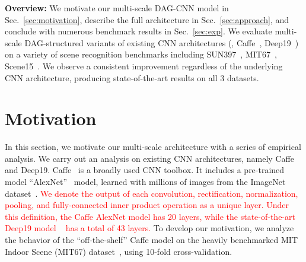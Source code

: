 \documentclass[10pt,twocolumn,letterpaper]{article}
\newcommand{\new}[1]{\textcolor{red}{#1}}
\begin{document}
{\bf Overview:} We motivate our multi-scale DAG-CNN model in Sec.~\ref{sec:motivation}, describe the full architecture in Sec.~\ref{sec:approach}, and conclude with numerous benchmark results in Sec.~\ref{sec:exp}. We evaluate multi-scale DAG-structured variants of existing CNN architectures (\eg, Caffe~\cite{Caffe}, Deep19~\cite{veryDeep}) on a variety of scene recognition benchmarks including SUN397~\cite{SUN397}, MIT67~\cite{MIT67}, Scene15~\cite{Scene15}. We observe a consistent improvement regardless of the underlying CNN architecture, producing state-of-the-art results on all 3 datasets.



\section{Motivation\label{sec:motivation}}

In this section, we motivate our multi-scale architecture with a series of empirical analysis. We carry out an analysis on existing CNN architectures, namely Caffe and Deep19. Caffe~\cite{Caffe} is a broadly used CNN toolbox. It includes a pre-trained model ``AlexNet''~\cite{AlexNet} model, learned with millions of images from the ImageNet dataset~\cite{ImageNet}. \new{We denote the output of each convolution, rectification, normalization, pooling, and fully-connected inner product operation as a unique layer. Under this definition, the Caffe AlexNet model has 20 layers, while the state-of-the-art Deep19 model ~\cite{veryDeep} has a total of 43 layers.}
To develop our motivation, we analyze the behavior of the ``off-the-shelf'' Caffe model on the heavily benchmarked MIT Indoor Scene (MIT67) dataset~\cite{MIT67}, using 10-fold cross-validation.
\end{document}
